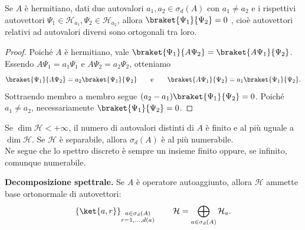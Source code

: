 \begin{theorem}
    Se \(A\) è hermitiano, dati due autovalori \(a_1, a_2 \in \sigma_d(A)\) con \(a_1\neq a_2\) e i rispettivi autovettori 
    \(\Psi_1 \in \mathcal{H}_{a_1}, \Psi_2 \in \mathcal{H}_{a_2}\), allora \(\braket{\Psi_1}{\Psi_2}=0\) , 
    cioè autovettori relativi ad autovalori diversi sono ortogonali tra loro.
\end{theorem}
\begin{proof}
    Poiché \(A\) è hermitiano, vale \(\braket{\Psi_1}{A\Psi_2}= \braket{A\Psi_1}{\Psi_2}\). Essendo 
    \(A\Psi_1=a_1\Psi_1\) e \(A\Psi_2=a_2\Psi_2\), otteniamo
    \[
        \braket{\Psi_1}{A\Psi_2}= a_2\braket{\Psi_1}{\Psi_2} \qquad \text{e} \qquad
        \braket{A\Psi_1}{\Psi_2}= a_1\braket{\Psi_1}{\Psi_2}.
    \]
    Sottraendo membro a membro segue \((a_2-a_1)\braket{\Psi_1}{\Psi_2}=0\). Poiché \(a_1\neq a_2\), 
    necessariamente \(\braket{\Psi_1}{\Psi_2}=0\).
\end{proof}

\begin{remark}
    Se \(\dim \mathcal{H} < +\infty\), il numero di autovalori distinti di \(A\) è finito e al più uguale a \(\dim \mathcal{H}\).
    Se \(\mathcal{H}\) è separabile, allora \(\sigma_d(A)\) è al più numerabile.\\
    Ne segue che lo spettro discreto è sempre un insieme finito oppure, se infinito, comunque numerabile.
\end{remark}

\begin{theorem}
    {\normalfont\textbf{Decomposizione spettrale.}}
    Se \(A\) è operatore autoaggiunto, allora \(\mathcal{H}\) ammette base ortonormale di autovettori:
    \begin{equation}
        \left\{ \ket{a, r} \right\}_{\substack{a \in \sigma_d(A)\\ r = 1,\dots,d(a)}}
        \qquad
        \mathcal{H} = \bigoplus_{a \in \sigma_d(A)} \mathcal{H}_a.
    \end{equation}
\end{theorem}

